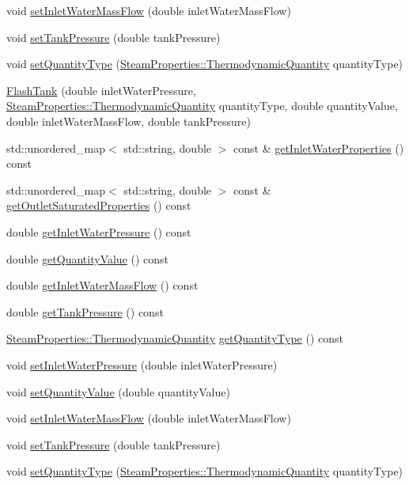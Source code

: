 \begin{DoxyCompactItemize}
\item 
void \hyperlink{class_flash_tank_a2bcbd92d39ef3c760bdd65066ba3d34a}{set\+Inlet\+Water\+Mass\+Flow} (double inlet\+Water\+Mass\+Flow)
\item 
void \hyperlink{class_flash_tank_a8b3bb51a62dac4f76284dfdc114d83fe}{set\+Tank\+Pressure} (double tank\+Pressure)
\item 
void \hyperlink{class_flash_tank_a30aa7a42d1547f61b176da4a15e8e8ee}{set\+Quantity\+Type} (\hyperlink{class_steam_properties_ae0294bedf7d178c2d8fb6aed0f62fbff}{Steam\+Properties\+::\+Thermodynamic\+Quantity} quantity\+Type)
\item 
\hyperlink{class_flash_tank_ad576e26508da35738127a65fd6ddc35d}{Flash\+Tank} (double inlet\+Water\+Pressure, \hyperlink{class_steam_properties_ae0294bedf7d178c2d8fb6aed0f62fbff}{Steam\+Properties\+::\+Thermodynamic\+Quantity} quantity\+Type, double quantity\+Value, double inlet\+Water\+Mass\+Flow, double tank\+Pressure)
\item 
std\+::unordered\+\_\+map$<$ std\+::string, double $>$ const  \& \hyperlink{class_flash_tank_a57a316e4ef448f4a9447b675ba6ac84b}{get\+Inlet\+Water\+Properties} () const
\item 
std\+::unordered\+\_\+map$<$ std\+::string, double $>$ const  \& \hyperlink{class_flash_tank_aa22fdef56a1ad6d70beda66cc8a6940a}{get\+Outlet\+Saturated\+Properties} () const
\item 
double \hyperlink{class_flash_tank_a62e8ff97d91da0845526c494022e41da}{get\+Inlet\+Water\+Pressure} () const
\item 
double \hyperlink{class_flash_tank_ab2145598969881df58736a1b65326d17}{get\+Quantity\+Value} () const
\item 
double \hyperlink{class_flash_tank_a2b6dcd9e175a9f2fc550ea91006aa66a}{get\+Inlet\+Water\+Mass\+Flow} () const
\item 
double \hyperlink{class_flash_tank_af5d4f0bf7babe61120e1e4452594e1af}{get\+Tank\+Pressure} () const
\item 
\hyperlink{class_steam_properties_ae0294bedf7d178c2d8fb6aed0f62fbff}{Steam\+Properties\+::\+Thermodynamic\+Quantity} \hyperlink{class_flash_tank_a1800317a9b9dd8ff8fb18c693e846a45}{get\+Quantity\+Type} () const
\item 
void \hyperlink{class_flash_tank_aed0991a7902401d110fb2f4b472326f5}{set\+Inlet\+Water\+Pressure} (double inlet\+Water\+Pressure)
\item 
void \hyperlink{class_flash_tank_ac7392743aeaf8de6ce368814ea42e236}{set\+Quantity\+Value} (double quantity\+Value)
\item 
void \hyperlink{class_flash_tank_a2bcbd92d39ef3c760bdd65066ba3d34a}{set\+Inlet\+Water\+Mass\+Flow} (double inlet\+Water\+Mass\+Flow)
\item 
void \hyperlink{class_flash_tank_a8b3bb51a62dac4f76284dfdc114d83fe}{set\+Tank\+Pressure} (double tank\+Pressure)
\item 
void \hyperlink{class_flash_tank_a30aa7a42d1547f61b176da4a15e8e8ee}{set\+Quantity\+Type} (\hyperlink{class_steam_properties_ae0294bedf7d178c2d8fb6aed0f62fbff}{Steam\+Properties\+::\+Thermodynamic\+Quantity} quantity\+Type)
\end{DoxyCompactItemize}


